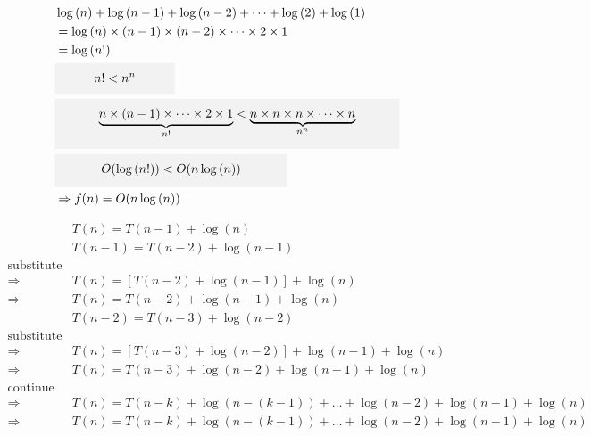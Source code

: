 \documentclass[12pt]{article}
\begin{document}
\begin{align*}
&\log{(n)} + \log{(n-1)} + \log{(n-2)} + \dots + \log{(2)} + \log{(1)} \\
&= \log{(n) \times (n-1) \times (n-2) \times \dots \times 2 \times 1} \\
&= \log{(n!)}\\
& \colorbox{gray!10}{\parbox{90pt}{
    $$n! < n^{n}$$
}}
\\
& \colorbox{gray!10}{\parbox{270pt}{
    $$\underbrace{n \times (n-1) \times \dots \times 2 \times 1}_{n!} < \underbrace{n \times n \times n \times \dots \times n}_{n^n}$$
}}
\\
& \colorbox{gray!10}{\parbox{180pt}{
    $$O(\log{(n!)}) < O(n\log{(n)})$$
}}
\\
&\Rightarrow f(n) = O(n\log{(n)})
\end{align*}









\begin{align*}
&T(n) = T(n-1) + \log{(n)} \\
&T(n-1) = T(n-2) + \log{(n-1)} \\
\text{substitute}& \\
\Rightarrow \quad &T(n) = \left[ T(n-2) + \log{(n-1)} \right] + \log{(n)} \\
\Rightarrow \quad &T(n) =  T(n-2) + \log{(n-1)} + \log{(n)}  \\
&T(n-2) = T(n-3) + \log{(n-2)} \\
\text{substitute} \\
\Rightarrow \quad &T(n) = [ T(n-3) + \log{(n-2)} ] + \log{(n-1)} + \log{(n)} \\
\Rightarrow \quad &T(n) =  T(n-3) + \log{(n-2)} + \log{(n-1)} + \log{(n)} \\
\text{continue for k times}& \\
\Rightarrow \quad &T(n) =  T(n-k) + \log{(n-(k-1))} + \dots + \log{(n-2)} + \log{(n-1)} + \log{(n)} \\
\Rightarrow \quad &T(n) =  T(n-k) + \log{(n-(k-1))} + \dots + \log{(n-2)} + \log{(n-1)} + \log{(n)} \\
\end{align*}
\end{document}
